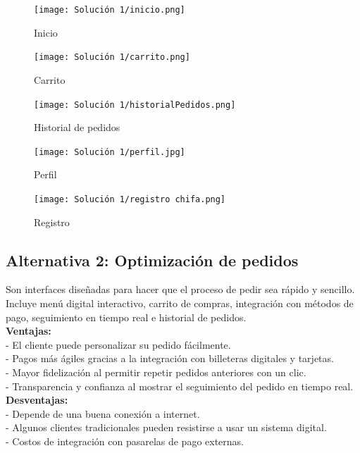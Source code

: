 \documentclass{article}
\begin{document}
\begin{doublespace}
    \begin{figure}[H]
        \centering
        \vspace*{1cm}
        \texttt{[image: Solución 1/inicio.png]}
        \caption{Inicio}
        \label{fig:Inicio}
    \end{figure}
    \begin{figure}[H]
        \centering
        \vspace*{1cm}
        \texttt{[image: Solución 1/carrito.png]}
        \caption{Carrito}
        \label{fig:Carrito}
    \end{figure}
    \begin{figure}[H]
        \centering
        \vspace*{1cm}
        \texttt{[image: Solución 1/historialPedidos.png]}
        \caption{Historial de pedidos}
        \label{fig:Historial-Pedidos}
    \end{figure}
    \begin{figure}[H]
        \centering
        \vspace*{1cm}
        \texttt{[image: Solución 1/perfil.jpg]}
        \caption{Perfil}
        \label{fig:Perfil}
    \end{figure}
    \begin{figure}[H]
        \centering
        \vspace*{1cm}
        \texttt{[image: Solución 1/registro chifa.png]}
        \caption{Registro}
        \label{fig:Registro}
    \end{figure}
    
    \subsection{Alternativa 2: Optimización de pedidos}

    \noindent Son interfaces diseñadas para hacer que el proceso de pedir sea rápido y sencillo. Incluye menú digital interactivo, carrito de compras, integración con métodos de pago, seguimiento en tiempo real e historial de pedidos.\\
    \textbf{Ventajas:}\\
    - El cliente puede personalizar su pedido fácilmente.\\
    - Pagos más ágiles gracias a la integración con billeteras digitales y tarjetas.\\
    - Mayor fidelización al permitir repetir pedidos anteriores con un clic.\\
    - Transparencia y confianza al mostrar el seguimiento del pedido en tiempo real.\\
    \textbf{Desventajas:}\\
    - Depende de una buena conexión a internet.\\
    - Algunos clientes tradicionales pueden resistirse a usar un sistema digital.\\
    - Costos de integración con pasarelas de pago externas.\\


\end{doublespace}
\end{document}
